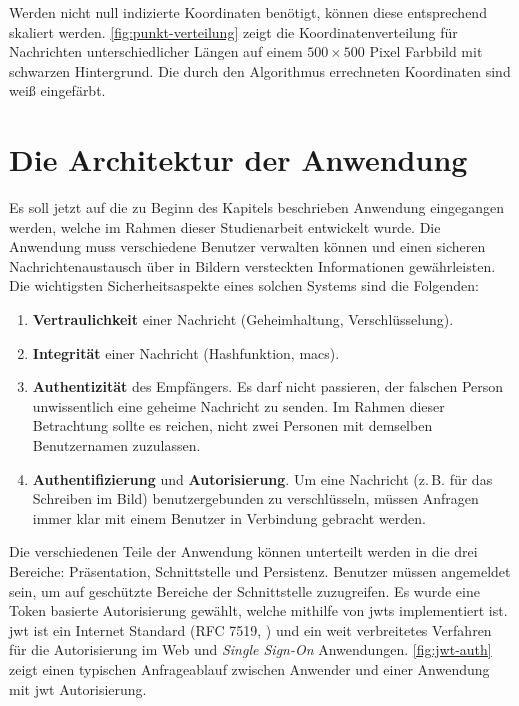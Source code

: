 \noindent
Werden nicht null indizierte Koordinaten benötigt, können diese entsprechend skaliert werden.
\autoref{fig:punkt-verteilung} zeigt die Koordinatenverteilung für Nachrichten unterschiedlicher
Längen auf einem $500 \times 500$ Pixel Farbbild mit schwarzen Hintergrund. Die durch den Algorithmus
errechneten Koordinaten sind weiß eingefärbt.



\newpage
\section{Die Architektur der Anwendung}
Es soll jetzt auf die zu Beginn des Kapitels beschrieben Anwendung
eingegangen werden, welche im Rahmen dieser Studienarbeit entwickelt wurde.
Die Anwendung muss verschiedene Benutzer verwalten können und
einen sicheren Nachrichtenaustausch über in Bildern
versteckten Informationen gewährleisten.
Die wichtigsten Sicherheitsaspekte eines
solchen Systems sind die Folgenden:
\begin{enumerate}
  \item \textbf{Vertraulichkeit} einer Nachricht (Geheimhaltung, Verschlüsselung).
  \item \textbf{Integrität} einer Nachricht (Hashfunktion, \acp{mac}).
  \item \textbf{Authentizität} des Empfängers. Es darf nicht passieren, der falschen Person
        unwissentlich eine geheime Nachricht zu senden. Im Rahmen dieser Betrachtung sollte
        es reichen, nicht zwei Personen mit demselben Benutzernamen zuzulassen.
  \item \textbf{Authentifizierung} und \textbf{Autorisierung}. Um eine Nachricht
        (z.\,B. für das Schreiben im Bild) benutzergebunden zu verschlüsseln,
        müssen Anfragen immer klar mit einem Benutzer in Verbindung gebracht werden.
\end{enumerate}

\noindent
Die verschiedenen Teile der Anwendung können unterteilt werden in die
drei Bereiche: Präsentation, Schnittstelle und Persistenz.
Benutzer müssen angemeldet sein, um auf geschützte Bereiche der Schnittstelle zuzugreifen.
Es wurde eine Token basierte Autorisierung gewählt, welche mithilfe von \acp{jwt}
implementiert ist. \ac{jwt} ist ein Internet Standard (RFC 7519, \cite{SITE:jwt}) und ein
weit verbreitetes Verfahren für die Autorisierung im Web und \textit{Single Sign-On} Anwendungen.
\autoref{fig:jwt-auth} zeigt einen typischen Anfrageablauf zwischen Anwender und einer Anwendung
mit \acs{jwt} Autorisierung.
\newpage


